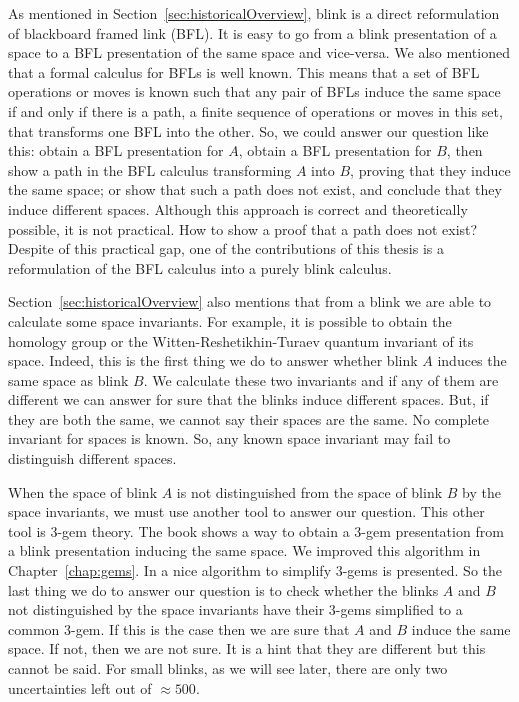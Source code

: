 As mentioned in Section~\ref{sec:historicalOverview}, blink is a direct
reformulation of blackboard framed link (BFL). It is easy to go from a blink
presentation of a space to a BFL presentation of the same space and
vice-versa. We also mentioned that a formal calculus for BFLs is well
known. This
means that a set of BFL operations or moves is known such that any pair
of BFLs induce the same space if and only if there
is a path, \ie a finite sequence of operations or moves in this set, that
transforms one BFL into the other. So, we could answer our question like
this: obtain a BFL presentation for $A$, obtain a BFL presentation for
$B$, then show a path in the BFL calculus transforming $A$ into $B$, proving
that they induce the same space; or show that such a path does not exist, and
conclude that they induce different spaces. Although this approach is correct and theoretically
possible, it is not practical. How to show a proof that a path does not
exist? Despite of this practical gap, one of the contributions of
this thesis is a reformulation of the BFL calculus into a purely blink
calculus.%

Section~\ref{sec:historicalOverview} also mentions that from a blink we
are able to calculate some space invariants. For example, it is possible
to obtain the homology group or the Witten-Reshetikhin-Turaev
quantum invariant of its space. Indeed, this is the first thing we do
to answer whether blink $A$ induces the same space as blink $B$. We
calculate these two invariants and if any of them are different
we can answer for sure that the blinks induce different spaces. But,
if they are both the same, we cannot say their spaces are the same.
No complete invariant for spaces is known. So, any known space
invariant may fail to distinguish different spaces.

When the space of blink $A$ is not distinguished from the space
of blink $B$ by the space invariants, we must use another tool to answer
our question. This other tool is 3-gem theory. The book
\cite{KauffmanAndLins1994} shows a way to obtain a 3-gem presentation
from a blink presentation inducing the same space. We improved this
algorithm in Chapter~\ref{chap:gems}. In \cite{Lins1995}
a nice algorithm to simplify 3-gems is presented. So the last thing
we do to answer our question is to check whether the
blinks $A$ and $B$ not distinguished by the space invariants have
their 3-gems simplified to a common 3-gem. If this is the case then
we are sure that $A$ and $B$ induce the same space. If not, then we
are not sure. It is a hint that they are different but this cannot
be said. For small blinks, as we will see later, there are only two
uncertainties left out of $\approx 500$.

